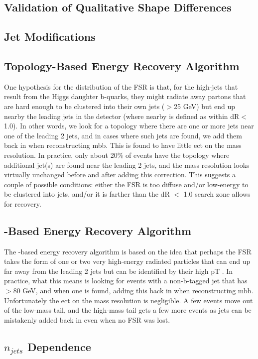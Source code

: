 \subsection{Validation of Qualitative Shape Differences}
\subsection{Jet Modifications}
\subsection{Topology-Based Energy Recovery Algorithm}
 One hypothesis for the distribution of the FSR is that, for the high-\pt jets that result from the Higgs
 daughter b-quarks, they might radiate away partons that are hard enough to be clustered into their own
 jets (\pt$>$25 GeV) but end up nearby the leading jets in the detector (where nearby is defined as within
 dR$<$1.0). In other words, we look for a topology where there are one or more jets near one of the leading
2 jets, and in cases where such jets are found, we add them back in when reconstructing mbb.
 This is found to have little ect on the mass resolution. In practice, only about 20\% of events
 have the topology where additional jet(s) are found near the leading 2 jets, and the mass resolution
 looks virtually unchanged before and after adding this correction. This suggests a couple of possible
 conditions: either the FSR is too diffuse and/or low-energy to be clustered into jets, and/or it is farther
 than the dR $<$ 1.0 search zone allows for recovery.


\subsection{\pt-Based Energy Recovery Algorithm}
The \pt-based energy recovery algorithm is based on the idea that perhaps the FSR takes the form of one
 or two very high-energy radiated particles that can end up far away from the leading 2 jets but can be
 identified by their high pT . In practice, what this means is looking for events with a non-b-tagged jet that
 has \pt$>$80 GeV, and when one is found, adding this back in when reconstructing mbb.
 Unfortunately the ect on the mass resolution is negligible. A few events move out of the low-mass
 tail, and the high-mass tail gets a few more events as jets can be mistakenly added back in even when no
 FSR was lost.

\subsection{$n_{jets}$ Dependence} 

